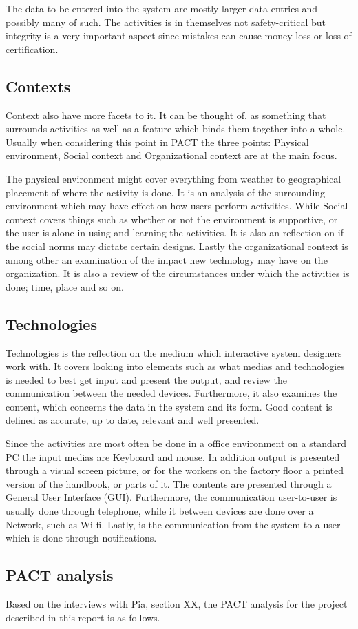 The data to be entered into the system are mostly larger data entries and possibly many of such.
The activities is in themselves not safety-critical but integrity is a very important aspect since mistakes can cause money-loss or loss of certification.

\subsection{Contexts}
Context also have more facets to it.
It can be thought of, as something that surrounds activities as well as a feature which binds them together into a whole.
Usually when considering this point in PACT the three points: Physical environment, Social context and Organizational context are at the main focus.

The physical environment might cover everything from weather to geographical placement of where the activity is done. 
It is an analysis of the surrounding environment which may have effect on how users perform activities.
While Social context covers things such as whether or not the environment is supportive, or the user is alone in using and learning the activities. 
It is also an reflection on if the social norms may dictate certain designs.
Lastly the organizational context is among other an examination of the impact new technology may have on the organization. 
It is also a review of the circumstances under which the activities is done; time, place and so on.

\subsection{Technologies}
Technologies is the reflection on the medium which interactive system designers work with.
It covers looking into elements such as what medias and technologies is needed to best get input and present the output, and review the communication between the needed devices.
Furthermore, it also examines the content, which concerns the data in the system and its form.
Good content is defined as accurate, up to date, relevant and well presented.

Since the activities are most often be done in a office environment on a standard PC the input medias are Keyboard and mouse.
In addition output is presented through a visual screen picture, or for the workers on the factory floor a printed version of the handbook, or parts of it.
The contents are presented through a General User Interface (GUI).
Furthermore, the communication user-to-user is usually done through telephone, while it between devices are done over a Network, such as Wi-fi.
Lastly, is the communication from the system to a user which is done through notifications.

\subsection{PACT analysis}\label{sec:PACT-analysis}
Based on the interviews with Pia,
{\color{red} section XX}, the PACT analysis for the project described in this report is as follows.












